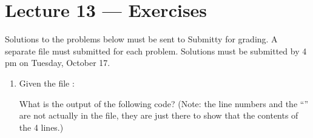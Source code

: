 \documentclass[letterpaper,10pt,english]{sphinxmanual}
\begin{document}
\chapter{Lecture 13 — Exercises}
\label{\detokenize{lecture_notes/lec13_files_exercises/exercises:lecture-13-exercises}}\label{\detokenize{lecture_notes/lec13_files_exercises/exercises::doc}}
Solutions to the problems below must be sent to Submitty for grading.
A separate file must submitted for each problem.  Solutions must be
submitted by 4 pm on Tuesday, October 17.
\begin{enumerate}
\item {} 
Given the file :

%
\begin{sphinxVerbatim}[commandchars=\\\{\}]
          
        
          
  
\end{sphinxVerbatim}

What is the output of the following code? (Note: the line
numbers and the “\textbar{}” are not actually in the file, they are just there to show
that the contents of the 4 lines.)


\end{enumerate}
\end{document}
